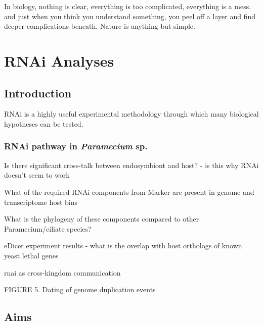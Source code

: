 \graphicspath{{chapters/6.Chapter_4/figures/}}

\begin{savequote}[75mm]
In biology, nothing is clear, everything is too complicated, everything is a mess, 
and just when you think you understand something, you peel off a layer and find 
deeper complications beneath. Nature is anything but simple.
\end{savequote}

\chapter{RNAi Analyses}


\section{Introduction}

RNAi is a highly useful experimental methodology through which
many biological hypotheses can be tested.





\subsection{RNAi pathway in \textit{Paramecium} sp.}

Is there significant cross-talk between endosymbiont and host? - is this why RNAi doesn't seem to work

What of the required RNAi components from Marker are present in genome and transcriptome host bins

What is the phylogeny of these components compared to other Paramecium/ciliate species?

eDicer experiment results - what is the overlap with host orthologs of known yeast lethal genes

rnai as cross-kingdom communication \citep{Weiberg2015}

FIGURE 5. Dating of genome duplication events







\section{Aims}

